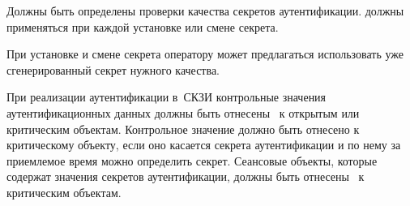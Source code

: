\label{R.IA.PwdSet} %
Должны быть определены  проверки качества 
секретов аутентификации.  должны применяться при каждой 
установке или смене секрета.

\begin{note}
При установке и смене секрета оператору может предлагаться использовать
уже сгенерированный секрет нужного качества.
\end{note}

\label{R.IA.AuthProtect} %
При реализации  аутентификации в~СКЗИ контрольные значения 
аутентификационных данных должны быть отнесены~ к открытым
или критическим объектам.
%
Контрольное значение должно быть отнесено к критическому объекту, 
если оно касается секрета аутентификации и по нему за приемлемое
время можно определить секрет.
%
Сеансовые объекты, которые содержат значения секретов аутентификации,
должны быть отнесены~ к критическим объектам.


